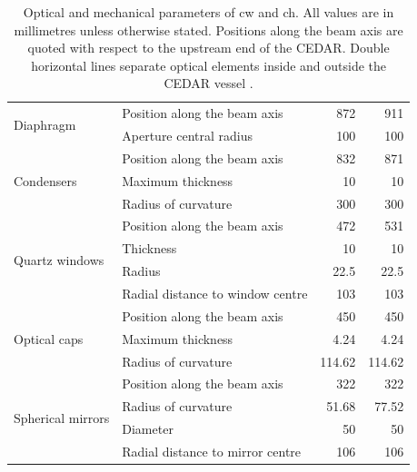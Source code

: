 \documentclass[../../main.tex]{subfiles}
\begin{document}
\begin{table}[htbp]
{\begin{tabular}{@{}llrr@{}}
        \multirow{2}{*}{Diaphragm}           & Position along the beam axis                 & 872 & 911 \\
        & Aperture central radius & 100  & 100 \\
        \midrule
        
        \multirow{3}{*}{Condensers}          & Position along the beam axis & 832 & 871 \\
        & Maximum thickness    & 10   & 10 \\
        & Radius of curvature  & 300  & 300 \\
        \midrule
        
        \multirow{4}{*}{Quartz windows}      & Position along the beam axis    & 472 & 531 \\
        & Thickness                 & 10  & 10 \\
        & Radius                    & 22.5  & 22.5 \\
        & Radial distance to window centre & 103 & 103 \\ 
        \bottomrule\bottomrule
        
        \multirow{3}{*}{Optical caps}          & Position along the beam axis & 450 & 450 \\
        & Maximum thickness    & 4.24   & 4.24 \\
        & Radius of curvature  & 114.62  & 114.62 \\
        \midrule
        
        \multirow{5}{*}{Spherical mirrors}   & Position along the beam axis             & 322 & 322 \\
        & Radius of curvature           & 51.68 & 77.52\\
        & Diameter                      & 50  & 50 \\
        & Radial distance to mirror centre & 106 & 106 \\ 
        \end{tabular}
        }
        \small\caption{Optical and mechanical parameters of \gls{cw} and \gls{ch}. All values are in millimetres unless otherwise stated. 
        Positions along the beam axis are quoted with respect to the upstream end of the \gls{CEDAR}. Double horizontal lines separate optical elements inside and outside the \gls{CEDAR} vessel \cite{NA62:2023mud}.}
        \label{table:CedarParameterValues}
    \end{table}
\end{document}
